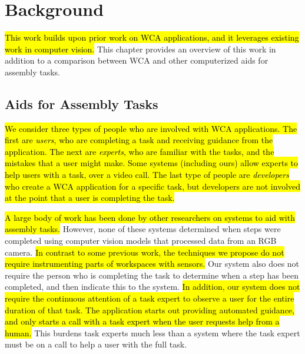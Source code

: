 \chapter{Background}\label{chap:background}

\hl{
This work builds upon prior work on WCA applications, and it leverages
existing work in computer vision.
}
This chapter provides an overview of this work in addition to a comparison
between WCA and other computerized aids for assembly tasks.

\section{Aids for Assembly Tasks}

\hl{
  We consider three types of people who are involved with WCA applications.
  The first are \emph{users}, who are completing a task and receiving guidance
  from the application.
  The next are \emph{experts}, who are familiar with the tasks, and the mistakes
  that a user might make.
  Some systems (including ours) allow experts to help users with a task, over a
  video call.
  The last type of people are \emph{developers} who create a WCA application for
  a specific task, but developers are not involved at the point that a user
  is completing the task.
}

\hl{
  A large body of work has been done by other researchers on systems to aid with
  assembly tasks.
}
However, none of these systems determined when steps were completed using
computer vision models that processed data from an RGB camera.
\hl{
In contrast to some previous work, the techniques we
propose do not require instrumenting parts of workspaces with sensors.
}
Our system also does not require the person who is completing the task to
determine when a step has been completed, and then indicate this to the system.
\hl{
  In addition, our system does not require the continuous attention of a task
  expert to observe a user for the entire duration of that task.
  The application starts out providing automated guidance, and only starts a call
  with a task expert when the user requests help from a human.
}
This burdens task experts much less than a system where the task expert must be
on a call to help a user with the full task.

